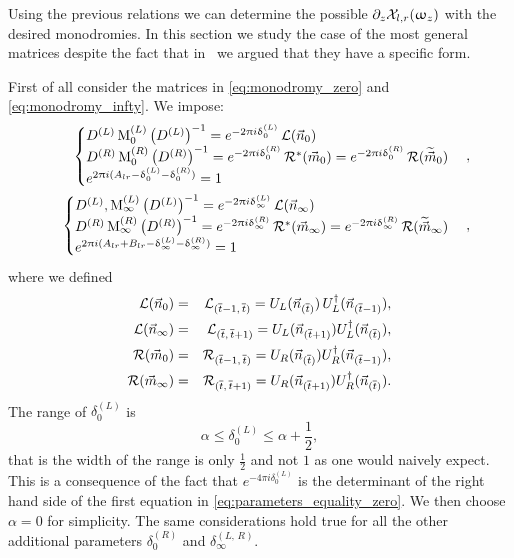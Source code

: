 Using the previous relations we can determine the possible $\partial_{z} \mathcal{X}_{l,r}(\upomega_z)$ with the desired monodromies.
In this section we study the case of the most general  matrices despite the fact that in~ we argued that they have a specific form.

First of all consider the matrices in \eqref{eq:monodromy_zero} and \eqref{eq:monodromy_infty}.
We impose:
\begin{eqnarray}
  &&\begin{cases}
    D^{(L)}\,
    \mathrm{M}_{0}^{(L)}\,
    \qty( D^{(L)} )^{-1}
    =
    e^{-2\uppi i \updelta_{0}^{(L)}}\,
    \mathcal{L}(\vec{n}_{0})
    \\
    D^{(R)}\,
    \mathrm{M}_{0}^{(R)}\,
    \qty( D^{(R)} )^{-1}
    =
    e^{-2\uppi i \updelta_{0}^{(R)}}\,
    \mathcal{R}^*(\vec{m}_{0})
    =
    e^{-2\uppi i \updelta_{0}^{(R)}}\,
    \mathcal{R}(\widetilde{\vec{m}}_{0})
    \\
    e^{2\uppi i ( A_{lr} - \updelta_{0}^{(L)} -
    \updelta_{0}^{(R)} )}
    =
    1
    \end{cases},
  \label{eq:parameters_equality_zero}
  \\
  &&\begin{cases}
    D^{(L)},
    \mathrm{M}_{\infty}^{(L)}\,
    \qty( D^{(L)} )^{-1}
    =
    e^{-2\uppi i \updelta_{\infty}^{(L)}}\,
    \mathcal{L}(\vec{n}_{\infty})
    \\
    D^{(R)}\,
    \mathrm{M}_{\infty}^{(R)}\,
    \qty( D^{(R)} )^{-1}
    =
    e^{-2\uppi i \updelta_{\infty}^{(R)}}\,
    \mathcal{R}^*(\vec{m}_{\infty})
    =
    e^{-2\uppi i \updelta_{\infty}^{(R)}}\,
    \mathcal{R}(\widetilde{\vec{m}}_{\infty})
    \\
    e^{2\uppi i ( A_{lr} + B_{lr} - \updelta_{\infty}^{(L)} -
    \updelta_{\infty}^{(R)} )}
    =
    1
  \end{cases},
  \label{eq:parameters_equality_infty}
\end{eqnarray}
where we defined
\begin{eqnarray}
  \mathcal{L}(\vec{n}_{0})
  & = &
  \mathcal{L}_{(\overline{t}-1,\,\overline{t})}
  =
  U_L(\vec{n}_{(\overline{t})})\,
  U_L^{\dagger}(\vec{n}_{(\overline{t}-1)}),
  \\
  \mathcal{L}(\vec{n}_{\infty})
  & = &
  \mathcal{L}_{(\overline{t},\, \overline{t}+1)}
  =
  U_L(\vec{n}_{(\overline{t}+1)})
  U_L^{\dagger}(\vec{n}_{(\overline{t})}),
  \\
  \mathcal{R}(\vec{m}_{0})
  & = &
  \mathcal{R}_{(\overline{t}-1,\, \overline{t})}
  =
  U_R(\vec{n}_{(\overline{t})})
  U_R^{\dagger}(\vec{n}_{(\overline{t}-1)}),
  \\
  \mathcal{R}(\vec{m}_{\infty})
  & = &
  \mathcal{R}_{(\overline{t},\, \overline{t}+1)}
  =
  U_R(\vec{n}_{(\overline{t}+1)})
  U_R^{\dagger}(\vec{n}_{(\overline{t})}).
\end{eqnarray}
The range of $\delta_{0}^{(L)}$ is
\begin{equation}
  \alpha \le \delta_{0}^{(L)} \le  \alpha + \frac{1}{2},
\end{equation}
that is the width of the range is only $\frac{1}{2}$ and not $1$ as one would naively expect.
This is a consequence of the fact that $e^{- 4 \pi i \delta_{0}^{(L)}}$ is the determinant of the right hand side of the first equation in \eqref{eq:parameters_equality_zero}.
We then choose $\alpha = 0$ for simplicity.
The same considerations hold true for all the other additional parameters $\delta_{0}^{(R)}$ and $\delta_{\infty}^{(L,\,R)}$.

